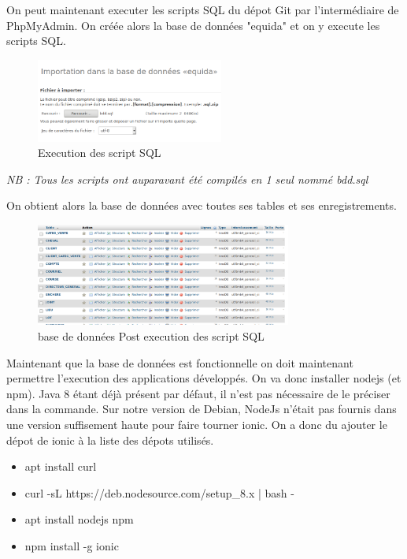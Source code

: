 \documentclass[report]{BetterDocument}
\newcommand{\bdd}{base de données}
\begin{document}
		On peut maintenant executer les scripts SQL du dépot Git par l'intermédiaire de PhpMyAdmin. On créée alors la \bdd{} "equida" et on y execute les scripts SQL.

		\begin{figure}[H]
			\centering\includegraphics[width=0.55\textwidth, keepaspectratio]{res/sql-bdd.png}
			\caption{Execution des script SQL}
		\end{figure}

		\textit{NB : Tous les scripts ont auparavant été compilés en 1 seul nommé bdd.sql}

		On obtient alors la \bdd{} avec toutes ses tables et ses enregistrements.

		\begin{figure}[H]
			\centering\includegraphics[width=0.75\textwidth, keepaspectratio]{res/bdd.png}
			\caption{\bdd{} Post execution des script SQL}
		\end{figure}

		Maintenant que la \bdd{} est fonctionnelle on doit maintenant permettre l'execution des applications développés. On va donc installer nodejs (et npm). Java 8 étant déjà présent par défaut, il n'est pas nécessaire de le préciser dans la commande. Sur notre version de Debian, NodeJs n'était pas fournis dans une version suffisement haute pour faire tourner ionic. On a donc du ajouter le dépot de ionic à la liste des dépots utilisés.

		\begin{itemize}
			\item{apt install curl}
			\item{curl -sL https://deb.nodesource.com/setup\_8.x | bash -}
 			\item{apt install nodejs npm}
			\item{npm install -g ionic}
		\end{itemize}
\end{document}
